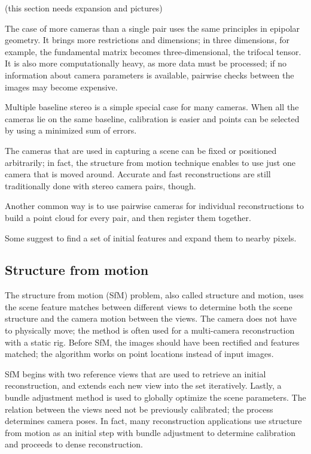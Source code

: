 (this section needs expansion and pictures)

The case of more cameras than a single pair uses the same principles in epipolar geometry.
It brings more restrictions and dimensions; in three dimensions, for example, the fundamental matrix becomes three-dimensional, the trifocal tensor. \cite{hartley03multiview}
It is also more computationally heavy, as more data must be processed; if no information about camera parameters is available, pairwise checks between the images may become expensive. \cite{wu2013towards}

Multiple baseline stereo is a simple special case for many cameras. When all the cameras lie on the same baseline, calibration is easier and points can be selected by using a minimized sum of errors. \cite{okutomi1993multiple}

The cameras that are used in capturing a scene can be fixed or positioned arbitrarily; in fact, the structure from motion technique enables to use just one camera that is moved around.
Accurate and fast reconstructions are still traditionally done with stereo camera pairs, though.

Another common way is to use pairwise cameras for individual reconstructions to build a point cloud for every pair, and then register them together. \cite{bradley2010high}

Some suggest to find a set of initial features and expand them to nearby pixels. %


\subsection{Structure from motion} %

The structure from motion (SfM) problem, also called structure and motion, uses the scene feature matches between different views to determine both the scene structure and the camera motion between the views.
\cite{snavely2006photo,fitzgibbon1998automatic} 
The camera does not have to physically move; the method is often used for a multi-camera reconstruction with a static rig.
Before SfM, the images should have been rectified and features matched; the algorithm works on point locations instead of input images.

SfM begins with two reference views that are used to retrieve an initial reconstruction, and extends each new view into the set iteratively.
Lastly, a bundle adjustment method is used to globally optimize the scene parameters.
The relation between the views need not be previously calibrated; the process determines camera poses.
In fact, many reconstruction applications use structure from motion as an initial step with bundle adjustment to determine calibration and proceeds to dense reconstruction.

